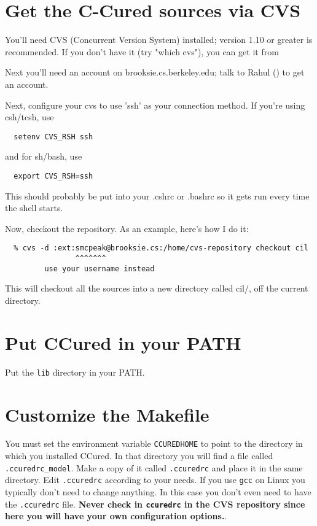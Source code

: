 \documentclass{book}
\def\t#1{{\tt #1}}
\begin{document}
\section{Get the C-Cured sources via CVS}

You'll need CVS (Concurrent Version System) installed; version 1.10 or
greater is recommended.  If you don't have it (try "which cvs"), you can
get it from


Next you'll need an account on brooksie.cs.berkeley.edu; talk to Rahul
() to get an account.

Next, configure your cvs to use 'ssh' as your connection method.  If you're
using csh/tcsh, use

\begin{verbatim}
  setenv CVS_RSH ssh
\end{verbatim}

  
and for sh/bash, use

\begin{verbatim}
  export CVS_RSH=ssh
\end{verbatim}

This should probably be put into your .cshrc or .bashrc so it gets run
every time the shell starts.

Now, checkout the repository.  As an example, here's how I do it:


\begin{verbatim}
  % cvs -d :ext:smcpeak@brooksie.cs:/home/cvs-repository checkout cil
                ^^^^^^^
         use your username instead
\end{verbatim}

This will checkout all the sources into a new directory called cil/, off
the current directory.


\section{Put CCured in your PATH}

 Put the \t{lib} directory in your PATH.

\section{Customize the Makefile}

 You must set the environment variable \t{CCUREDHOME} to point to the
directory in which you installed CCured. In that directory you will find a
file called \t{.ccuredrc\_model}. Make a copy of it called \t{.ccuredrc} and
place it in the same directory. Edit \t{.ccuredrc} according to your needs. If
you use \t{gcc} on Linux you typically don't need to change anything. In this
case you don't even need to have the \t{.ccuredrc} file. {\bf Never check in
\t{ccuredrc} in the CVS repository since here you will have your own
configuration options.}.
\end{document}
